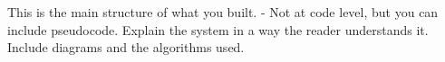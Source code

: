 This is the main structure of what you built.
- Not at code level, but you can include pseudocode.
Explain the system in a way the reader understands it.
Include diagrams and the algorithms used.
